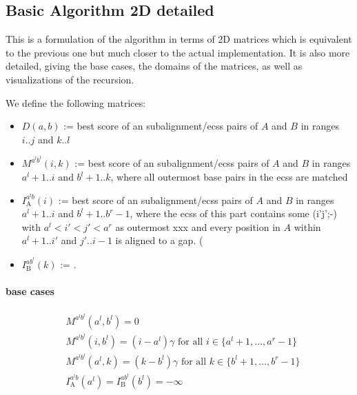 \documentclass{article}
\newcommand{\DTmat}[2]{D(#1,#2)}
\newcommand{\MTmat}[4]{M^{{#1}^l {#2}^l}(#3,#4)}
\newcommand{\IATmat}[3]{I^{{#1}^l {#2}}_\textrm{A}(#3)}
\newcommand{\IBTmat}[3]{I^{{#1} {#2}^l}_\textrm{B}(#3)}
\begin{document}
\subsection{Basic Algorithm 2D detailed}
This is a formulation of the algorithm in terms of 2D matrices which
is equivalent to the previous one but much closer to the actual
implementation. It is also more detailed, giving the base cases, the
domains of the matrices, as well as visualizations of the recursion.

We define the following matrices:
\begin{itemize}
\item $\DTmat{a}{b}$ := best score of an subalignment/ecss pairs of $A$ and $B$
  in ranges ${i..j}$ and ${k..l}$
\item $\MTmat{a}{b}{i}{k}$ := best score of an subalignment/ecss pairs
  of $A$ and $B$ in ranges ${a^l+1..i}$ and ${b^l+1..k}$, where all outermost
  base pairs in the ecss are matched
\item $\IATmat{a}{b}{i}$ := best score of an subalignment/ecss pairs
  of $A$ and $B$ in ranges ${a^l+1..i}$ and ${b^l+1..b^r-1}$, where
  the ecss of this part contains some (i'j';-) with $a^l<i'<j'<a^r$ as
  outermost xxx and every position in $A$ within $a^l+1..i'$ and $j'..i-1$ is
  aligned to a gap. (
\item $\IBTmat{a}{b}{k}$ := .
\end{itemize}
\paragraph{base cases}
\begin{align}
  &\MTmat{a}{b}{a^l}{b^l}=0\\
  &\MTmat{a}{b}{i}{b^l}=(i-a^l)\gamma \text{ for all }i\in \{a^l+1,\dots,a^r-1\}\\
  &\MTmat{a}{b}{a^l}{k}=(k-b^l)\gamma \text{ for all }k\in \{b^l+1,\dots,b^r-1\}\\
  &\IATmat{a}{b}{a^l}=\IBTmat{a}{b}{b^l}=-\infty
\end{align}
\end{document}
